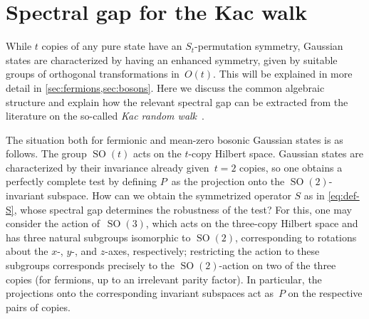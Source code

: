 \documentclass[11pt,a4paper]{article}
\numberwithin{equation}{section}
\newcommand{\1}{\mathbf{1}}
\DeclareMathOperator{\SO}{SO}
\begin{document}
\section{Spectral gap for the Kac walk}\label{sec:kac}
While $t$ copies of any pure state have an $S_t$-permutation symmetry, Gaussian states are characterized by having an enhanced symmetry, given by suitable groups of orthogonal transformations in~$O(t)$.
This will be explained in more detail in \cref{sec:fermions,sec:bosons}.
Here we discuss the common algebraic structure and explain how the relevant spectral gap can be extracted from the literature on the so-called \emph{Kac random walk}~\cite{kac1956foundations}.

The situation both for fermionic and mean-zero bosonic Gaussian states is as follows.
The group $\SO(t)$ acts on the $t$-copy Hilbert space.
Gaussian states are characterized by their invariance already given~$t=2$ copies, so one obtains a perfectly complete test by defining $P$~as the projection onto the $\SO(2)$-invariant subspace.
How can we obtain the symmetrized operator $S$ as in \cref{eq:def-S}, whose spectral gap determines the robustness of the test?
For this, one may consider the action of~$\SO(3)$, which acts on the three-copy Hilbert space and has three natural subgroups isomorphic to $\SO(2)$, corresponding to rotations about the $x$-, $y$-, and $z$-axes, respectively;
restricting the action to these subgroups corresponds precisely to the $\SO(2)$-action on two of the three copies (for fermions, up to an irrelevant parity factor).
In particular, the projections onto the corresponding invariant subspaces act as~$P$ on the respective pairs of copies.
\end{document}
